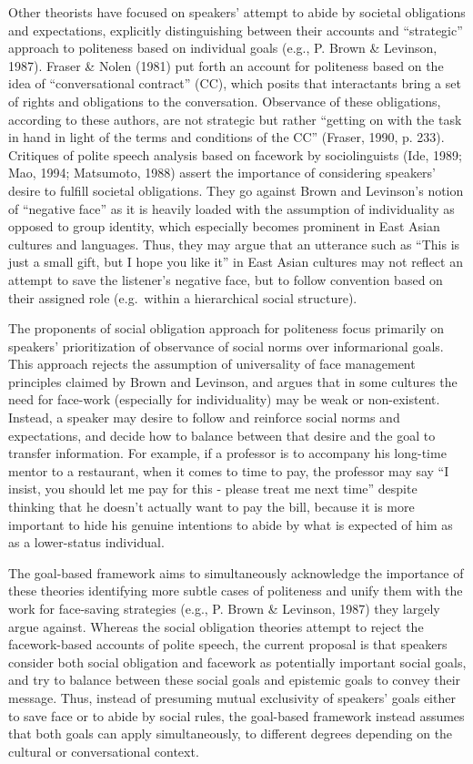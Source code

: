 \documentclass[oneside]{report}
\begin{document}
Other theorists have focused on speakers' attempt to abide by societal
obligations and expectations, explicitly distinguishing between their
accounts and ``strategic'' approach to politeness based on individual
goals (e.g., P. Brown \& Levinson, 1987). Fraser \& Nolen (1981) put
forth an account for politeness based on the idea of ``conversational
contract'' (CC), which posits that interactants bring a set of rights
and obligations to the conversation. Observance of these obligations,
according to these authors, are not strategic but rather ``getting on
with the task in hand in light of the terms and conditions of the CC''
(Fraser, 1990, p. 233). Critiques of polite speech analysis based on
facework by sociolinguists (Ide, 1989; Mao, 1994; Matsumoto, 1988)
assert the importance of considering speakers' desire to fulfill
societal obligations. They go against Brown and Levinson's notion of
``negative face'' as it is heavily loaded with the assumption of
individuality as opposed to group identity, which especially becomes
prominent in East Asian cultures and languages. Thus, they may argue
that an utterance such as ``This is just a small gift, but I hope you
like it'' in East Asian cultures may not reflect an attempt to save the
listener's negative face, but to follow convention based on their
assigned role (e.g.~within a hierarchical social structure).

The proponents of social obligation approach for politeness focus
primarily on speakers' prioritization of observance of social norms over
informarional goals. This approach rejects the assumption of
universality of face management principles claimed by Brown and
Levinson, and argues that in some cultures the need for face-work
(especially for individuality) may be weak or non-existent. Instead, a
speaker may desire to follow and reinforce social norms and
expectations, and decide how to balance between that desire and the goal
to transfer information. For example, if a professor is to accompany his
long-time mentor to a restaurant, when it comes to time to pay, the
professor may say ``I insist, you should let me pay for this - please
treat me next time'' despite thinking that he doesn't actually want to
pay the bill, because it is more important to hide his genuine
intentions to abide by what is expected of him as as a lower-status
individual.

The goal-based framework aims to simultaneously acknowledge the
importance of these theories identifying more subtle cases of politeness
and unify them with the work for face-saving strategies (e.g., P. Brown
\& Levinson, 1987) they largely argue against. Whereas the social
obligation theories attempt to reject the facework-based accounts of
polite speech, the current proposal is that speakers consider both
social obligation and facework as potentially important social goals,
and try to balance between these social goals and epistemic goals to
convey their message. Thus, instead of presuming mutual exclusivity of
speakers' goals either to save face or to abide by social rules, the
goal-based framework instead assumes that both goals can apply
simultaneously, to different degrees depending on the cultural or
conversational context.
\end{document}
